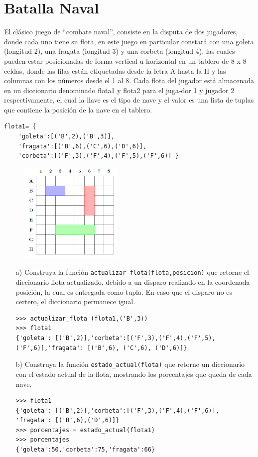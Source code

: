 \section{Batalla Naval}

El clásico juego de “combate naval”, consiste en la disputa de dos jugadores, donde cada uno tiene su flota, en este juego en particular constará con una goleta (longitud 2), una fragata (longitud 3) y una corbeta (longitud 4), las cuales pueden estar posicionadas de forma vertical u horizontal en un tablero de 8 x 8 celdas, donde las filas están etiquetadas desde la letra A hasta la H y las columnas con los números desde el 1 al 8. Cada flota del jugador está almacenada en un diccionario denominado flota1 y flota2 para el juga-dor 1 y jugador 2 respectivamente, el cual la llave es el tipo de nave y el valor es una lista de tuplas que contiene la posición de la nave en el tablero.

\begin{lstlisting}[style=consola]
flota1= {
    'goleta':[('B',2),('B',3)],
    'fragata':[('B',6),('C',6),('D',6)],
    'corbeta':[('F',3),('F',4),('F',5),('F',6)] }
\end{lstlisting}

\begin{figure}[h]
    \centering
    \includegraphics{Guia/batalla.png}
\end{figure}

\begin{itemize}
    \item[a)] Construya la función \texttt{actualizar\_flota(flota,posicion)} que retorne el diccionario flota actualizado, debido a un disparo realizado en la coordenada posición, la cual es entregada como tupla. En caso que el disparo no es certero, el diccionario permanece igual.
    \begin{lstlisting}[style=consola]
>>> actualizar_flota (flota1,('B',3))
>>> flota1
{'goleta': [('B',2)],'corbeta':[('F',3),('F',4),('F',5),
('F',6)],'fragata': [('B',6), ('C',6), ('D',6)]} 
    \end{lstlisting}
    \item[b)] Construya la función \texttt{estado\_actual(flota)} que retorne un diccionario con el estado actual de la flota, mostrando los porcentajes que queda de cada nave.
    \begin{lstlisting}[style=consola]
>>> flota1
{'goleta': [('B',2)],'corbeta':[('F',3),('F',4),('F',6)],
'fragata': [('B',6),('D',6)]}
>>> porcentajes = estado_actual(flota1)
>>> porcentajes
{'goleta':50,'corbeta':75,'fragata':66}
    \end{lstlisting}
\end{itemize}